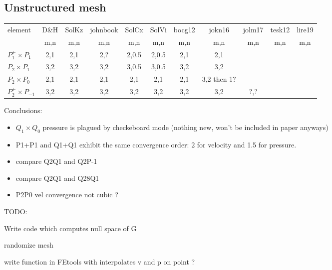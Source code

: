 \subsection*{Unstructured mesh}

\begin{scriptsize}
\begin{center}
\begin{tabular}{|l|c|c|c|c|c|c|c|c|c|c|}
\hline
element & D\&H  & SolKz &  johnbook  & SolCx &  SolVi & bocg12& 
jokn16 & jolm17 & tesk12 & lire19 \\
& m,n&  m,n&  m,n&  m,n&  m,n&  m,n&  m,n&  m,n& m,n& m,n\\
\hline
$P_1^+\times P_{1}$   &  
2,1 & 2,1 &  2,? &  2,0.5 & 2,0.5 &2,1 & 2,1  \\
$P_2\times P_1$       &  
{\color{teal} 3,2} & 
{\color{teal} 3,2} &  
{\color{teal} 3,2} &  
3,0.5 & 
3,0.5 &
{\color{teal} 3,2} & 
{\color{teal} 3,2}   \\
$P_2\times P_0$       &  
2,1 & 2,1 &  2,1 &  2,1   & 2,1   &2,1 & 3,2 then 1?  \\
$P_2^+\times P_{-1}$  &  
{\color{teal} 3,2} & 
{\color{teal} 3,2} & 
{\color{teal} 3,2} & 
{\color{teal} 3,2} & 
{\color{teal} 3,2} & 
{\color{teal} 3,2} & 
{\color{teal} 3,2} &
?,?\\
\hline
\end{tabular}
\end{center}
\end{scriptsize}




\newpage
Conclusions:
\begin{itemize}
\item $Q_1\times Q_0$ pressure is plagued by checkeboard mode (nothing new, won't be included in paper anyways)
\item P1+P1 and Q1+Q1 exhibit the same convergence order: 2 for velocity and 1.5 for pressure.
\item compare Q2Q1 and Q2P-1
\item compare Q2Q1 and Q28Q1
\item P2P0 vel convergence not cubic ?
\end{itemize}


TODO:

Write code which computes null space of G 

randomize mesh

write function in FEtools with interpolates v and p on point ?

